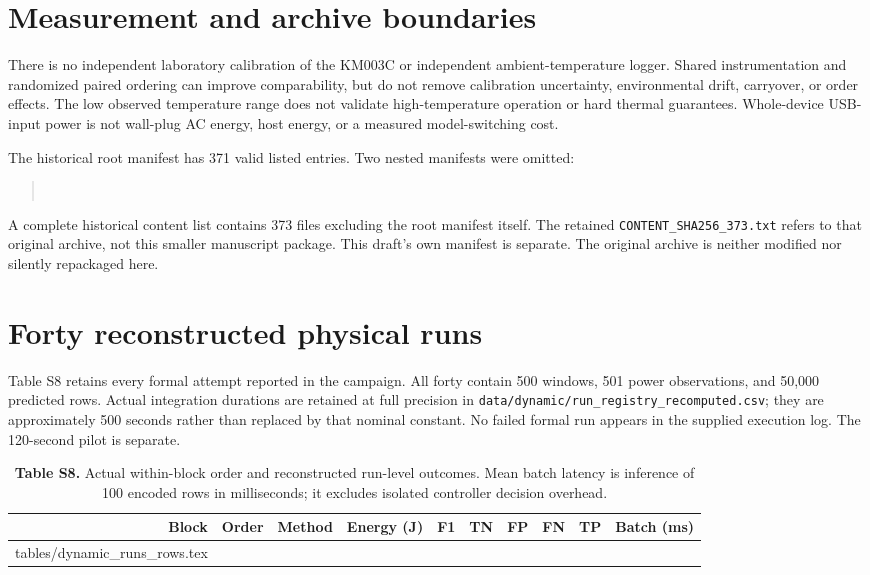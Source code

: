 \documentclass[10pt,a4paper]{article}
\makeatletter
\renewcommand{\arraystretch}{1.12}
\newcommand{\tableinput}[1]{\@@input #1.tex }
\makeatother
\begin{document}
\section{Measurement and archive boundaries}
There is no independent laboratory calibration of the KM003C or independent ambient-temperature logger. Shared instrumentation and randomized paired ordering can improve comparability, but do not remove calibration uncertainty, environmental drift, carryover, or order effects. The low observed temperature range does not validate high-temperature operation or hard thermal guarantees. Whole-device USB-input power is not wall-plug AC energy, host energy, or a measured model-switching cost.

The historical root manifest has 371 valid listed entries. Two nested manifests were omitted:
\begin{quote}\small
{}\\
\end{quote}
A complete historical content list contains 373 files excluding the root manifest itself. The retained \texttt{CONTENT\_SHA256\_373.txt} refers to that original archive, not this smaller manuscript package. This draft's own manifest is separate. The original archive is neither modified nor silently repackaged here.

\clearpage
\section{Forty reconstructed physical runs}
Table S8 retains every formal attempt reported in the campaign. All forty contain 500 windows, 501 power observations, and 50,000 predicted rows. Actual integration durations are retained at full precision in \texttt{data/dynamic/run\_registry\_recomputed.csv}; they are approximately 500 seconds rather than replaced by that nominal constant. No failed formal run appears in the supplied execution log. The 120-second pilot is separate.

\begin{table}[h!]
\centering\small
\caption*{\textbf{Table S8.} Actual within-block order and reconstructed run-level outcomes. Mean batch latency is inference of 100 encoded rows in milliseconds; it excludes isolated controller decision overhead.}
\setlength{\tabcolsep}{3.2pt}\renewcommand{\arraystretch}{1.06}
\begin{tabular}{rrlrrrrrrr}\toprule
Block & Order & Method & Energy (J) & F1 & TN & FP & FN & TP & Batch (ms)\\\midrule
\tableinput{tables/dynamic_runs_rows}
\bottomrule\end{tabular}
\end{table}
\end{document}
